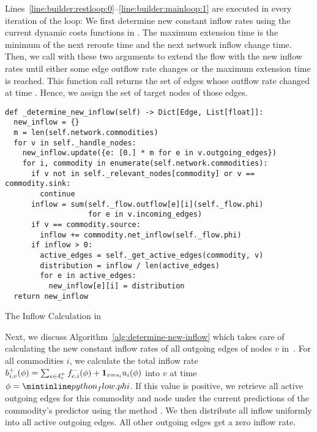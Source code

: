 Lines~\ref{line:builder:restloop:0}--\ref{line:builder:mainloop:1} are executed in every iteration of the loop:
We first determine new constant inflow rates using the current dynamic costs functions in .
The maximum extension time is the minimum of the next reroute time and the next network inflow change time.
Then, we call  with these two arguments to extend the flow with the new inflow rates until either some edge outflow rate changes or the maximum extension time is reached.
This function call returns the set of edges whose outflow rate changed at time .
Hence, we assign  the set of target nodes of those edges. 

\begin{algorithm}
  \begin{verbatim}
def _determine_new_inflow(self) -> Dict[Edge, List[float]]:
  new_inflow = {}
  m = len(self.network.commodities)
  for v in self._handle_nodes:
    new_inflow.update({e: [0.] * m for e in v.outgoing_edges})
    for i, commodity in enumerate(self.network.commodities):
      if v not in self._relevant_nodes[commodity] or v == commodity.sink:
        continue
      inflow = sum(self._flow.outflow[e][i](self._flow.phi)
                   for e in v.incoming_edges)
      if v == commodity.source:
        inflow += commodity.net_inflow(self._flow.phi)
      if inflow > 0:
        active_edges = self._get_active_edges(commodity, v)
        distribution = inflow / len(active_edges)
        for e in active_edges:
          new_inflow[e][i] = distribution
  return new_inflow
\end{verbatim}
\caption{The Inflow Calculation in }
\label{alg:determine-new-inflow}
\end{algorithm}


Next, we discuss Algorithm~\ref{alg:determine-new-inflow} which takes care of calculating the new constant inflow rates of all outgoing edges of nodes $v$ in~.
For all commodities $i$, we calculate the total inflow rate $b_{i,v}^+(\phi) = \sum_{e\in\delta^+_{v}} {f}^-_{e,i}(\phi) + \mathbf{1}_{v=s_i} u_i(\phi)$ into $v$ at time $\phi = \code{_flow.phi}$.
If this value is positive, we retrieve all active outgoing edges for this commodity and node under the current predictions of the commodity's predictor using the method .
We then distribute all inflow uniformly into all active outgoing edges. All other outgoing edges get a zero inflow rate.

